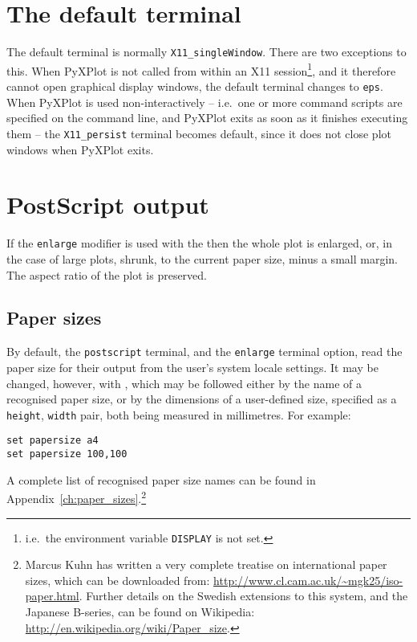 \section{The default terminal}

The default terminal is normally {\tt X11\_singleWindow}. There are two
exceptions to this.  When PyXPlot is not called from within an X11
session\footnote{i.e.\ the environment variable {\tt DISPLAY} is not set.}, and
it therefore cannot open graphical display windows, the default terminal
changes to {\tt eps}.  When PyXPlot is used non-interactively -- i.e.\ one or
more command scripts are specified on the command line, and PyXPlot exits as
soon as it finishes executing them -- the {\tt X11\_persist} terminal becomes
default, since it does not close plot windows when PyXPlot exits.

\section{PostScript output}

If the {\tt enlarge} modifier is used with the  then the
whole plot is enlarged, or, in the case of large plots, shrunk, to the current
paper size, minus a small margin. The aspect ratio of the plot is preserved.

\subsection{Paper sizes}
\label{sec:set_papersize}

By default, the {\tt postscript} terminal, and the {\tt enlarge} terminal
option, read the paper size for their output from the user's system locale
settings. It may be changed, however, with , which may
be followed either by the name of a recognised paper size, or by the dimensions
of a user-defined size, specified as a {\tt height}, {\tt width} pair, both
being measured in millimetres. For example:

\begin{verbatim}
set papersize a4
set papersize 100,100
\end{verbatim}

\noindent A complete list of recognised paper size names can be found in
Appendix~\ref{ch:paper_sizes}.\footnote{Marcus Kuhn has written a very complete
treatise on international paper sizes, which can be downloaded from:
\url{http://www.cl.cam.ac.uk/~mgk25/iso-paper.html}. Further details on the
Swedish extensions to this system, and the Japanese B-series, can be found on
Wikipedia: \url{http://en.wikipedia.org/wiki/Paper_size}.}

